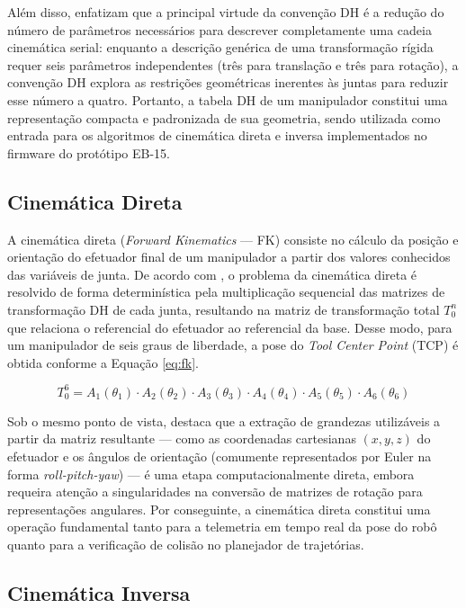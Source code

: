 Além disso,  enfatizam que a principal virtude da convenção DH é a redução do número de parâmetros necessários para descrever completamente uma cadeia cinemática serial: enquanto a descrição genérica de uma transformação rígida requer seis parâmetros independentes (três para translação e três para rotação), a convenção DH explora as restrições geométricas inerentes às juntas para reduzir esse número a quatro. Portanto, a tabela DH de um manipulador constitui uma representação compacta e padronizada de sua geometria, sendo utilizada como entrada para os algoritmos de cinemática direta e inversa implementados no firmware do protótipo EB-15.

\subsection{Cinemática Direta}

A cinemática direta (\textit{Forward Kinematics} — FK) consiste no cálculo da posição e orientação do efetuador final de um manipulador a partir dos valores conhecidos das variáveis de junta. De acordo com , o problema da cinemática direta é resolvido de forma determinística pela multiplicação sequencial das matrizes de transformação DH de cada junta, resultando na matriz de transformação total $T_0^n$ que relaciona o referencial do efetuador ao referencial da base. Desse modo, para um manipulador de seis graus de liberdade, a pose do \textit{Tool Center Point} (TCP) é obtida conforme a Equação \ref{eq:fk}.

\begin{equation}
T_0^6 = A_1(\theta_1) \cdot A_2(\theta_2) \cdot A_3(\theta_3) \cdot A_4(\theta_4) \cdot A_5(\theta_5) \cdot A_6(\theta_6)
\label{eq:fk}
\end{equation}

Sob o mesmo ponto de vista,  destaca que a extração de grandezas utilizáveis a partir da matriz resultante — como as coordenadas cartesianas $(x, y, z)$ do efetuador e os ângulos de orientação (comumente representados por Euler na forma \textit{roll-pitch-yaw}) — é uma etapa computacionalmente direta, embora requeira atenção a singularidades na conversão de matrizes de rotação para representações angulares. Por conseguinte, a cinemática direta constitui uma operação fundamental tanto para a telemetria em tempo real da pose do robô quanto para a verificação de colisão no planejador de trajetórias.

\subsection{Cinemática Inversa}

